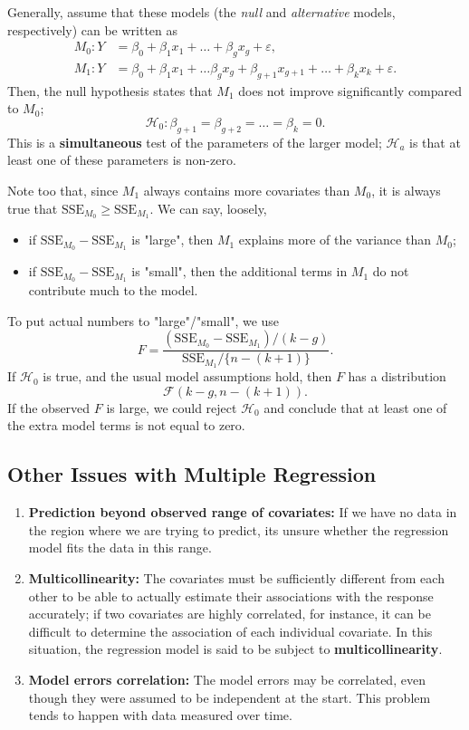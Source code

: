 \documentclass[12pt]{article}
\begin{document}
Generally, assume that these models (the \textit{null} and \textit{alternative} models, respectively) can be written as \[\begin{aligned}
    M_0: Y &= \beta_0 + \beta_1 x_1 + \dots + \beta_g x_g + \varepsilon,\\
    M_1: Y &= \beta_0 + \beta_1 x_1 + \dots \beta_g x_g + \beta_{g +1} x_{g+1} + \dots + \beta_k x_k + \varepsilon.
\end{aligned}\] Then, the null hypothesis states that $M_1$ does not improve significantly compared to $M_0$; \[\mathcal{H}_0: \beta_{g+1} = \beta_{g+2} = \dots = \beta_k = 0.\] This is a \textbf{simultaneous} test of the parameters of the larger model; $\mathcal{H}_a$ is that at least one of these parameters is non-zero. 

Note too that, since $M_1$ always contains more covariates than $M_0$, it is always true that $\text{SSE}_{M_0} \geq \text{SSE}_{M_1}$. We can say, loosely, \begin{itemize}
    \item if $\text{SSE}_{M_0} - \text{SSE}_{M_1}$ is "large", then $M_1$ explains more of the variance than $M_0$;
    \item if $\text{SSE}_{M_0} - \text{SSE}_{M_1}$ is "small", then the additional terms in $M_1$ do not contribute much to the model.
\end{itemize}

To put actual numbers to "large"/"small", we use \[F = \frac{(\text{SSE}_{M_0} -\text{SSE}_{M_1})/(k-g)}{\text{SSE}_{M_1}/\{n - (k + 1)\}}.\] If $\mathcal{H}_0$ is true, and the usual model assumptions hold, then $F$ has a distribution \[\mathcal{F}(k - g, n - (k + 1)).\] If the observed $F$ is large, we could reject $\mathcal{H}_0$ and conclude that at least one of the extra model terms is not equal to zero.

\subsection{Other Issues with Multiple Regression}

\begin{enumerate}
    
\item \textbf{Prediction beyond observed range of covariates:} If we have no data in the region where we are trying to predict, its unsure whether the regression model fits the data in this range.

\item \textbf{Multicollinearity:} The covariates must be sufficiently different from each other to be able to actually estimate their associations with the response accurately; if two covariates are highly correlated, for instance, it can be difficult to determine the association of each individual covariate. In this situation, the regression model is said to be subject to \textbf{multicollinearity}.

\item \textbf{Model errors correlation:} The model errors may be correlated, even though they were assumed to be independent at the start. This problem tends to happen with data measured over time.
\end{enumerate}
\end{document}
